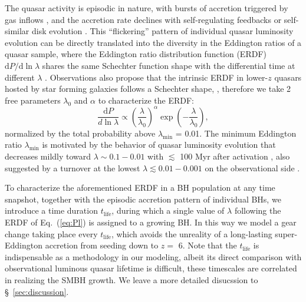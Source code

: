 \documentclass[nolinenumbers,preprint2,tighten]{aastex631}
\newcommand{\tlife}{t_\mathrm{life}}
\newcommand{\D}{\mathrm{d}}
\begin{document}
\begin{CJK*}{UTF8}{gbsn}
The quasar activity is episodic in nature, with bursts of accretion triggered by gas inflows 
\citep{2005Natur.433..604D,2005ApJ...630..705H}, 
and the accretion rate declines with self-regulating feedbacks \citep[e.g.,][]{2008ApJ...686..815Y,2011ApJ...737...26N} or 
self-similar disk evolution \citep{1991MNRAS.248..754P,2005ApJ...634..901Y,2007MNRAS.377L..25K}.
This ``flickering'' pattern of individual quasar luminosity evolution can be directly translated into the diversity in the Eddington ratios 
of a quasar sample, where the Eddington ratio distribution function (ERDF) $\D P/ \D\ln\lambda$ shares the same Schechter function shape 
with the differential time at different $\lambda$ \citep{2006ApJ...639..700H,2009ApJ...698.1550H}.
Observations also propose that the intrinsic ERDF in lower-$z$ quasars hosted by star forming galaxies follows a Schechter shape, 
\citep{2015MNRAS.447.2085S,2016ApJ...826...12J,2018MNRAS.474.1225A}, 
therefore we take 2 free parameters $\lambda_0$ and $\alpha$ to characterize the ERDF:
\begin{equation}
  \label{eq:Pl}
  \frac{\D P}{ d\ln \lambda} \propto
  \left(\frac{\lambda} {\lambda_0} \right)^\alpha \exp{\left(-\frac{\lambda}{\lambda_0}\right)},
\end{equation}
normalized by the total probability above $\lambda_\mathrm{min}$ = 0.01.
The minimum Eddington ratio $\lambda_\mathrm{min}$ is motivated by the behavior of quasar luminosity evolution 
that decreases mildly toward $\lambda\sim 0.1-0.01$ with $\lesssim$ 100 Myr after activation \citep{2011ApJ...737...26N}, 
also suggested by a turnover at the lowest $\lambda\lesssim 0.01-0.001$ on the observational side \citep{2018MNRAS.474.1225A}.  

To characterize the aforementioned ERDF in a BH population at any time snapshot, 
together with the episodic accretion pattern of individual BHs, 
we introduce a time duration $\tlife$, 
during which a single value of $\lambda$ following the ERDF of Eq.~(\ref{eq:Pl}) is assigned to a growing BH.
In this way we model a gear change taking place every $\tlife$, 
which avoids the unreality of a long-lasting super-Eddington accretion from seeding down to $z=$ 6. 
Note that the $\tlife$ is indispensable as a methodology in our modeling, 
albeit its direct comparison with observational luminous quasar lifetime is difficult, 
these timescales are correlated in realizing the SMBH growth. 
We leave a more detailed disucssion to \S~\ref{sec:discussion}.


\end{CJK*}
\end{document}
